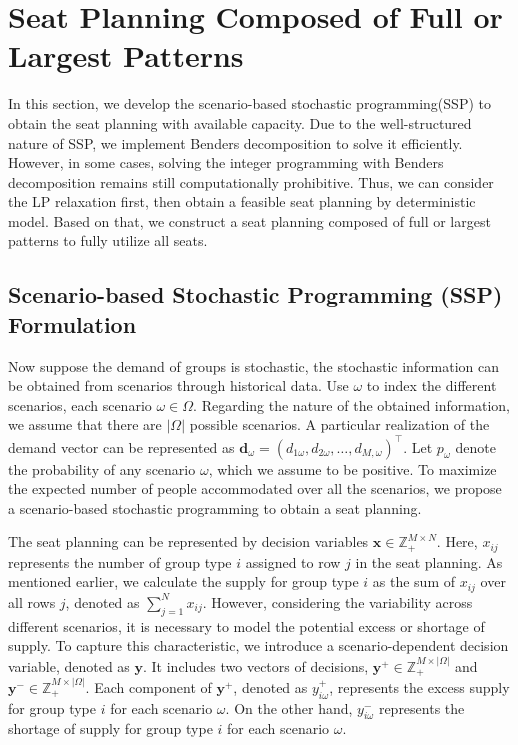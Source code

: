 \section{Seat Planning Composed of Full or Largest Patterns}\label{sec_seat_planning}
In this section, we develop the scenario-based stochastic programming(SSP) to obtain the seat planning with available capacity. Due to the well-structured nature of SSP, we implement Benders decomposition to solve it efficiently. However, in some cases, solving the integer programming with Benders decomposition remains still computationally prohibitive. Thus, we can consider the LP relaxation first, then obtain a feasible seat planning by deterministic model. Based on that, we construct a seat planning composed of full or largest patterns to fully utilize all seats.


\subsection{Scenario-based Stochastic Programming (SSP) Formulation}
Now suppose the demand of groups is stochastic, the stochastic information can be obtained from scenarios through historical data. Use $\omega$ to index the different scenarios, each scenario $\omega \in \Omega$. Regarding the nature of the obtained information, we assume that there are $|\Omega|$ possible scenarios. A particular realization of the demand vector can be represented as $\mathbf{d}_\omega = (d_{1\omega},d_{2\omega},\ldots,d_{M,\omega})^{\intercal}$. Let $p_{\omega}$ denote the probability of any scenario $\omega$, which we assume to be positive. To maximize the expected number of people accommodated over all the scenarios, we propose a scenario-based stochastic programming to obtain a seat planning.

The seat planning can be represented by decision variables $\mathbf{x} \in \mathbb{Z}_{+}^{M \times N}$. Here, $x_{ij}$ represents the number of group type $i$ assigned to row $j$ in the seat planning. As mentioned earlier, we calculate the supply for group type $i$ as the sum of $x_{ij}$ over all rows $j$, denoted as $\sum_{j=1}^N x_{ij}$. However, considering the variability across different scenarios, it is necessary to model the potential excess or shortage of supply. To capture this characteristic, we introduce a scenario-dependent decision variable, denoted as $\mathbf{y}$. 
It includes two vectors of decisions, $\mathbf{y}^{+} \in \mathbb{Z}_{+}^{M \times |\Omega|}$ and $\mathbf{y}^{-} \in \mathbb{Z}_{+}^{M \times |\Omega|}$. Each component of $\mathbf{y}^{+}$, denoted as $y_{i\omega}^{+}$, represents the excess supply for group type $i$ for each scenario $\omega$. On the other hand, $y_{i\omega}^{-}$ represents the shortage of supply for group type $i$ for each scenario $\omega$.

